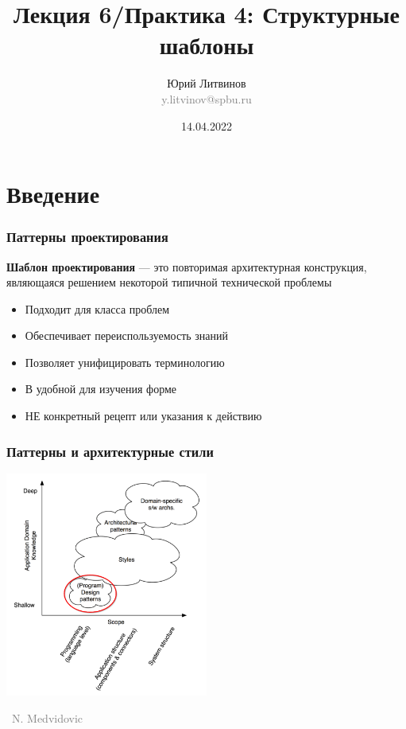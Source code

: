 \documentclass[xetex,mathserif,serif]{beamer}
\title[Структурные шаблоны]{Лекция 6/Практика 4: Структурные шаблоны}
\author[Юрий Литвинов]{Юрий Литвинов\\\small{\textcolor{gray}{y.litvinov@spbu.ru}}}
\date{14.04.2022}
\newcommand{\attribution}[1] {
    \vspace{-5mm}\begin{flushright}\begin{scriptsize}\textcolor{gray}{\textcopyright\, #1}\end{scriptsize}\end{flushright}
}
\begin{document}
    \frame{\titlepage}

    \section{Введение}

    \begin{frame}
        \frametitle{Паттерны проектирования}
        \textbf{Шаблон проектирования} --- это повторимая архитектурная конструкция, являющаяся решением некоторой типичной технической проблемы
        \begin{itemize}
            \item Подходит для класса проблем
            \item Обеспечивает переиспользуемость знаний
            \item Позволяет унифицировать терминологию
            \item В удобной для изучения форме
            \item НЕ конкретный рецепт или указания к действию
        \end{itemize}
    \end{frame}

    \begin{frame}
        \frametitle{Паттерны и архитектурные стили}
        \begin{center}
            \includegraphics[width=0.5\textwidth]{architecturalStylesPatternsHighlighted.png}
            \attribution{N. Medvidovic}
        \end{center}
    \end{frame}
\end{document}
